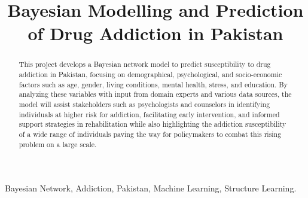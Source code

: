 \documentclass[conference]{IEEEtran}
\begin{document}
\title{Bayesian Modelling and Prediction of Drug Addiction in Pakistan\\
}

\author{
\and
{}
\and
{}
}

\maketitle

\begin{abstract}
This project develops a Bayesian network model to predict susceptibility to drug addiction in Pakistan, focusing on demographical, psychological, and socio-economic factors such as age, gender, living conditions, mental health, stress, and education. By analyzing these variables with input from domain experts and various data sources, the model will assist stakeholders such as psychologists and counselors in identifying individuals at higher risk for addiction, facilitating early intervention, and informed support strategies in rehabilitation while also highlighting the addiction susceptibility of a wide range of individuals paving the way for policymakers to combat this rising problem on a large scale.\end{abstract}

\begin{IEEEkeywords}
Bayesian Network, Addiction, Pakistan, Machine Learning, Structure Learning.
\end{IEEEkeywords}
\end{document}
